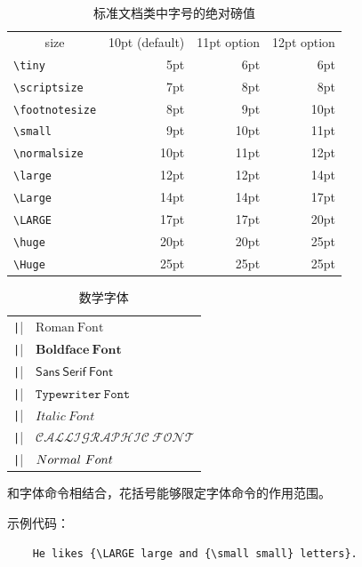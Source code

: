 \documentclass[UTF8]{ctexart}
\begin{document}
\begin{table}[!tbp]
\centering
\caption{标准文档类中字号的绝对磅值} \label{tab:pointsizes}
\begin{tabular}{lrrr}
\multicolumn{1}{c}{size} &
\multicolumn{1}{c}{10pt (default) } &
           \multicolumn{1}{c}{11pt option}  &
           \multicolumn{1}{c}{12pt option}\\
\verb|\tiny|       & 5pt  & 6pt & 6pt\\
\verb|\scriptsize| & 7pt  & 8pt & 8pt\\
\verb|\footnotesize| & 8pt & 9pt & 10pt \\
\verb|\small|        & 9pt & 10pt & 11pt \\
\verb|\normalsize| & 10pt & 11pt & 12pt \\
\verb|\large|      & 12pt & 12pt & 14pt \\
\verb|\Large|      & 14pt & 14pt & 17pt \\
\verb|\LARGE|      & 17pt & 17pt & 20pt\\
\verb|\huge|       & 20pt & 20pt & 25pt\\
\verb|\Huge|       & 25pt & 25pt & 25pt\\
\end{tabular}
\end{table}

\begin{table}[!bp]
\centering
\caption{数学字体} \label{tab:mathfonts}
\begin{tabular}{@{}ll@{}}
\texttt|\mathrm{...}|&     $\mathrm{Roman\ Font}$\\
\texttt|\mathbf{...}|&     $\mathbf{Boldface\ Font}$\\
\texttt|\mathsf{...}|&     $\mathsf{Sans\ Serif\ Font}$\\
\texttt|\mathtt{...}|&     $\mathtt{Typewriter\ Font}$\\
\texttt|\mathit{...}|&     $\mathit{Italic\ Font}$\\
\texttt|\mathcal{...}|&    $\mathcal{CALLIGRAPHIC\ FONT}$\\
\texttt|\mathnormal{...}|& $\mathnormal{Normal\ Font}$\\
\end{tabular}
\end{table}

和字体命令相结合，花括号能够限定字体命令的作用范围。

示例代码：
\begin{verbatim}
    He likes {\LARGE large and {\small small} letters}.
\end{verbatim}
\end{document}
